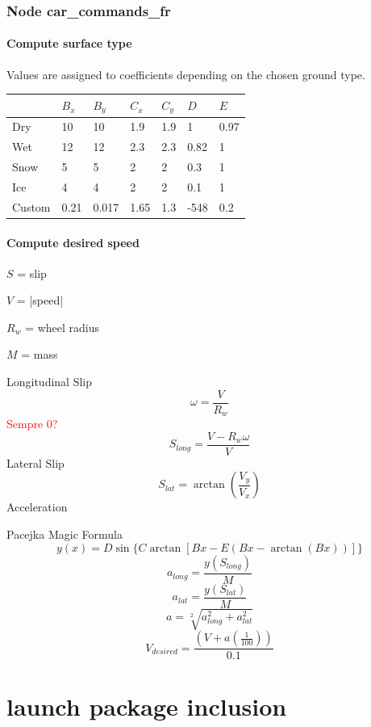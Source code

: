 \documentclass[12pt, letterpaper]{report}
\begin{document}
\subsection{Node car\_commands\_fr}

\subsubsection{Compute surface type}

Values are assigned to coefficients depending on the chosen ground type.

\begin{center}
	\begin{tabularx}{\textwidth}{|X|X|X|X|X|X|X|}
		\hline
		 & $B_x$ & $B_y$ & $C_x$ & $C_y$ & $D$ & $E$ \\
		\hline
		Dry & 10 & 10 & 1.9 & 1.9 & 1 & 0.97 \\
		\hline
		Wet & 12 & 12 & 2.3 & 2.3 & 0.82 & 1 \\
		\hline
		Snow & 5 & 5 & 2 & 2 & 0.3 & 1 \\
		\hline
		Ice & 4 & 4 & 2 & 2 & 0.1 & 1 \\
		\hline
		Custom & 0.21 & 0.017 & 1.65 & 1.3 & -548 & 0.2 \\
		\hline
	\end{tabularx}
\end{center}

\subsubsection{Compute desired speed}

$S$ = slip

$V$ = |speed|

$R_w$ = wheel radius 

$M$ = mass

Longitudinal Slip
\[
\omega = \frac{V}{R_w}
\]
\textcolor{red}{Sempre 0?}
\[
S_{long} = \frac{V - R_w\omega}{V}
\]
Lateral Slip
\[
S_{lat} = \arctan\left(\frac{V_y}{V_x}\right)
\]
Acceleration

Pacejka Magic Formula
\[
y(x) = D\sin\{C\arctan[Bx - E(Bx - \arctan(Bx))]\}
\]
\[
a_{long} = \frac{y(S_{long})}{M}
\]
\[
a_{lat} = \frac{y(S_{lat})}{M}
\]
\[
a = \sqrt[2]{a_{long}^2 + a_{lat}^2}
\]
\[
V_{desired} = \frac{\left(V + a\left(\frac{1}{100}\right)\right)}{0.1}
\]

\appendix

\chapter{launch package inclusion}
\end{document}
